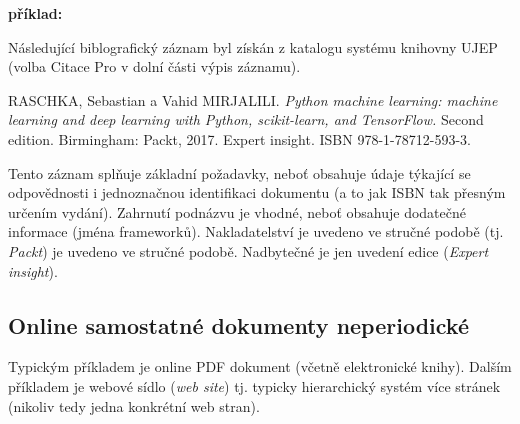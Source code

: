 \documentclass[male,czech,api_bc]{kitheses}
\begin{document}
\textbf{příklad:}

Následující biblografický záznam byl získán z katalogu systému knihovny UJEP (volba Citace Pro v dolní části výpis záznamu).

RASCHKA, Sebastian a Vahid MIRJALILI. \textit{Python machine learning: machine learning and deep learning with Python, scikit-learn, and TensorFlow.} Second edition. Birmingham: Packt, 2017. Expert insight. ISBN 978-1-78712-593-3.

Tento záznam splňuje základní požadavky, neboť obsahuje údaje týkající se odpovědnosti i jednoznačnou identifikaci dokumentu (a to jak ISBN tak přesným určením vydání).  Zahrnutí podnázvu
je vhodné, neboť obsahuje dodatečné informace (jména frameworků).
Nakladatelství je uvedeno ve stručné podobě (tj. \textit{Packt}) je uvedeno ve stručné podobě. Nadbytečné je jen uvedení edice (\textit{Expert insight}).

\subsection{Online samostatné dokumenty neperiodické}

Typickým příkladem je online PDF dokument (včetně elektronické knihy). Dalším příkladem je webové sídlo (\textit{web site}) tj. typicky hierarchický systém více stránek (nikoliv tedy jedna konkrétní web stran).
\end{document}
